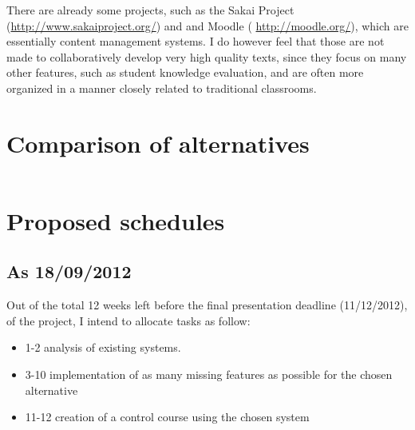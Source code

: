 \documentclass[12pt]{article}
\begin{document}
There are already some projects, such as the Sakai Project (\url{http://www.sakaiproject.org/}) and and Moodle (
\url{http://moodle.org/}), which are essentially content management systems. I do however feel that those are not made to collaboratively develop very high quality texts, since they focus on many other features, such as student knowledge evaluation, and are often more organized in a manner closely related to traditional classrooms.

\section{Comparison of alternatives}

\begin{tabular}{c} \label{tabComparisonOfAlternatives}

\end{tabular}

\section{Proposed schedules}

\subsection{As 18/09/2012}

Out of the total 12 weeks left before the final presentation deadline (11/12/2012), of the project, I intend to allocate tasks as follow:

\begin{itemize}
  \item 1-2 analysis of existing systems.
  \item 3-10 implementation of as many missing features as possible for the chosen alternative
  \item 11-12 creation of a control course using the chosen system
\end{itemize}

\newpage

\end{document}
